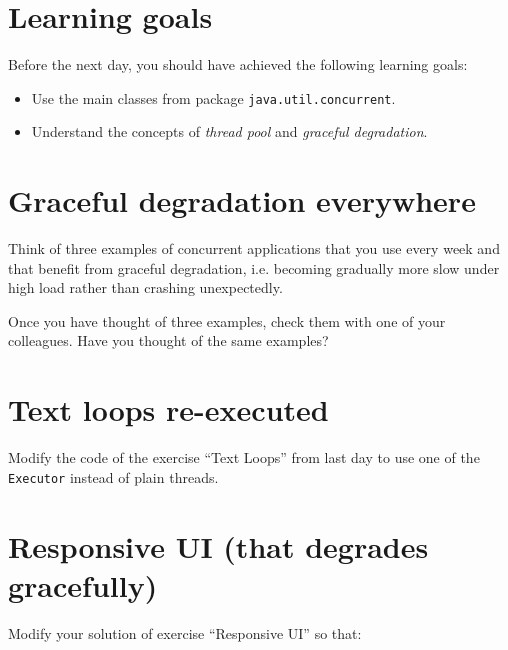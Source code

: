 \documentclass{article}
\begin{document}
\section*{Learning goals}
\label{sec:learning-goals}

Before the next day, you should have achieved the following learning
goals: 

\begin{itemize}
\item Use the main classes from package \verb+java.util.concurrent+.
\item Understand the concepts of \emph{thread pool} and \emph{graceful
  degradation}.
\end{itemize}

\section{Graceful degradation everywhere}
\label{sec:grac-degr-everywh}

Think of three examples of concurrent applications that you use every
week and that benefit from graceful degradation, i.e. becoming
gradually more slow under high load rather than crashing unexpectedly.

Once you have thought of three examples, check them with one of your
colleagues. Have you thought of the same examples?

\section{Text loops re-executed}
\label{sec:text-loops}

Modify the code of the exercise ``Text Loops'' from last day to use
one of the \verb+Executor+ instead of plain threads. 

\section{Responsive UI (that degrades gracefully)}
\label{sec:responsive-ui-that}

Modify your solution of exercise ``Responsive UI'' so that: 
\end{document}
